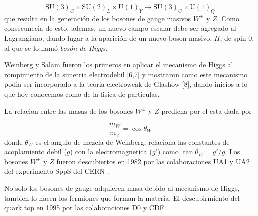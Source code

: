 \begin{equation}
  \text{SU}(3)_C \times \text{SU}(2)_L \times \text{U}(1)_Y \to \text{SU}(3)_C \times \text{U}(1)_Q
\end{equation}
%
que resulta en la generación de los bosones de gauge masivos $W^\pm$ y $Z$. Como consecunecia de esto,
ademas, un nuevo campo escalar debe ser agregado al Lagrangiano, dando lugar a la
aparici\'on de un nuevo boson masivo, $H$, de spin 0, al que se lo llam\'o \emph{bos\'on de Higgs}.

Weinberg y Salam fueron los primeros en aplicar el mecanismo de Higgs al rompimiento de la
simetria electrodebil [6,7] y mostraron como este mecanismo podia ser incorporado a la teoria
electroweak de Glashow [8], dando inicios a lo que hoy conocemos como {\SM} de la fisica
de particulas.

La relacion entre las masas de los bosones $W^\pm$ y $Z$ predicha por el {\SM} esta dada por

\begin{equation}
  \frac{m_W}{m_Z} = \cos \theta_W
\end{equation}
%
donde $\theta_W$ es el angulo de mezcla de Weinberg, relaciona las constantes de acoplamiento
debil ($g$) con la electromagnetica ($g'$) como  $\tan\theta_W = g'/g$.
Los bosones $W^\pm$ y $Z$ fueron descubiertos en 1982 por las colaboraciones UA1 y UA2 del
experimento SppS del CERN .

No solo los bosones de gauge adquieren masa debido al mecanismo de Higgs, tambien lo hacen
los fermiones que forman la materia. El descubirmiento del quark top en 1995 por las colaboraciones
D0 y CDF... 








